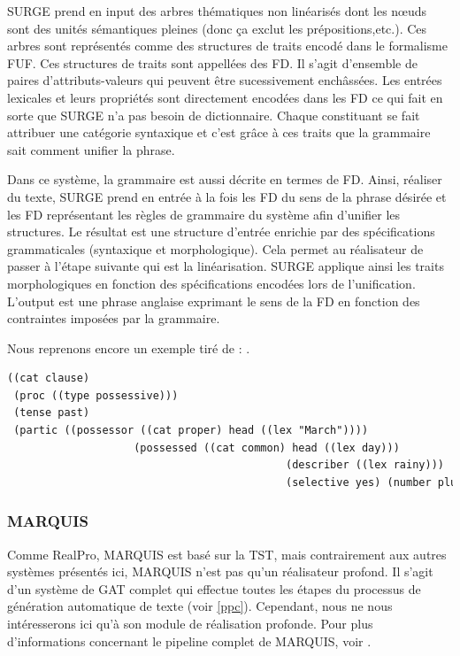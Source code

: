 SURGE prend en input des arbres thématiques non linéarisés dont les n\oe{}uds sont des unités sémantiques pleines (donc ça exclut les prépositions,etc.). Ces arbres sont représentés comme des structures de traits encodé dans le formalisme \ac{FUF}. Ces structures de traits sont appellées des \ac{FD}. Il s'agit d'ensemble de paires d'attributs-valeurs qui peuvent être sucessivement enchâssées. Les entrées lexicales et leurs propriétés sont directement encodées dans les \ac{FD} ce qui fait en sorte que SURGE n'a pas besoin de dictionnaire. Chaque constituant se fait attribuer une catégorie syntaxique et c'est grâce à ces traits que la grammaire sait comment unifier la phrase.

Dans ce système, la grammaire est aussi décrite en termes de \ac{FD}. Ainsi, réaliser du texte, SURGE prend en entrée à la fois les \ac{FD} du sens de la phrase désirée et les \ac{FD} représentant les règles de grammaire du système afin d'unifier les structures. Le résultat est une structure d'entrée enrichie par des spécifications grammaticales (syntaxique et morphologique). Cela permet au réalisateur de passer à l'étape suivante qui est la linéarisation. SURGE applique ainsi les traits morphologiques en fonction des spécifications encodées lors de l'unification. L'output est une phrase anglaise exprimant le sens de la \ac{FD} en fonction des contraintes imposées par la grammaire.

Nous reprenons encore un exemple tiré de \cite{ReiterBuildingNaturalLanguage2000}: .

\begin{lstlisting}[language=Xml, caption=FD: input de Surge, label=surge]
((cat clause)
 (proc ((type possessive)))
 (tense past)
 (partic ((possessor ((cat proper) head ((lex "March"))))
					(possessed ((cat common) head ((lex day)))
											(describer ((lex rainy)))
											(selective yes) (number plural)))))
\end{lstlisting}

\subsubsection{MARQUIS}\label{sectionmarquis}
Comme RealPro, MARQUIS est basé sur la \ac{TST}, mais contrairement aux autres systèmes présentés ici, MARQUIS n'est pas qu'un réalisateur profond. Il s'agit d'un système de \ac{GAT} complet qui effectue toutes les étapes du processus de génération automatique de texte (voir \ref{ppc}). Cependant, nous ne nous intéresserons ici qu'à son module de réalisation profonde.\citep{Lareau2007TowardsAG} Pour plus d'informations concernant le pipeline complet de MARQUIS, voir \citep{WannerMARQUISGENERATIONUSERTAILORED2010}. 

